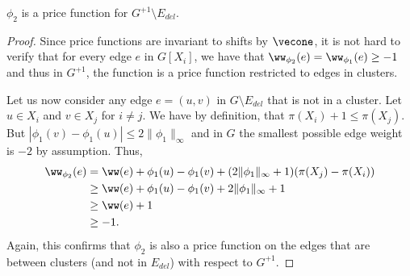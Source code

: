\begin{claim}
$\phi_2$ is a price function for $G^{+1} \setminus E_{del}$. 
\end{claim}
\begin{proof}
Since price functions are invariant to shifts by $\vecone$, it is not hard to verify that for every edge $e$ in $G[X_i]$, we have that $\ww_{\phi_2}(e)  = \ww_{\phi_1}(e) \geq -1$ and thus in $G^{+1}$, the function is a price function restricted to edges in clusters.

Let us now consider any edge $e = (u,v)$ in $G \setminus E_{del}$ that is not in a cluster. Let $u \in X_i$ and $v \in X_j$ for $i \neq j$. We have by definition, that $\pi(X_i) + 1 \leq \pi(X_j)$. But $|\phi_1(v) - \phi_1(u)| \leq 2\|\phi_1 \|_{\infty}$ and in $G$ the smallest possible edge weight is $-2$ by assumption. Thus, 
\begin{align*}
\ww_{\phi_2}(e) &= \ww(e) + \phi_1(u) - \phi_1(v) + (2\|\phi_1 \|_{\infty} + 1) (\pi(X_j) - \pi(X_i)) \\
& \geq \ww(e) + \phi_1(u) - \phi_1(v) + 2\|\phi_1 \|_{\infty} + 1\\
& \geq \ww(e) +1 \\
&\geq -1.
\end{align*} 
Again, this confirms that $\phi_2$ is also a price function on the edges that are between clusters (and not in $E_{del}$) with respect to $G^{+1}$.
\end{proof}

